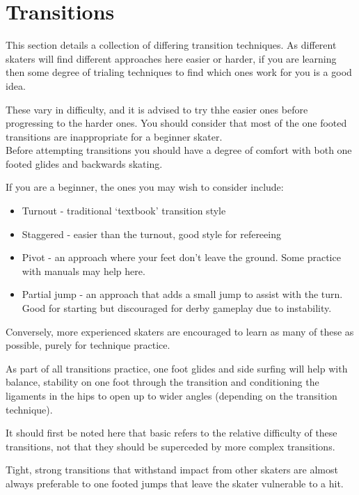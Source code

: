 \chapter{Transitions}

This section details a collection of differing transition techniques.
As different skaters will find different approaches here easier or harder, if you are learning then some degree of trialing techniques to find which ones work for you is a good idea. 

These vary in difficulty, and it is advised to try thhe easier ones before progressing to the harder ones.
You should consider that most of the one footed transitions are inappropriate for a beginner skater.\\


Before attempting transitions you should have a degree of comfort with both one footed glides and backwards skating.  

If you are a beginner, the ones you may wish to consider include:
\begin{itemize}
\item Turnout - traditional `textbook' transition style
\item Staggered - easier than the turnout, good style for refereeing    
\item Pivot - an approach where your feet don't leave the ground. Some practice with manuals may help here.  
\item Partial jump - an approach that adds a small jump to assist with the turn. Good for starting but discouraged for derby gameplay due to instability.   
\end{itemize}

Conversely, more experienced skaters are encouraged to learn as many of these as possible, purely for technique practice.  

As part of all transitions practice, one foot glides and side surfing will help with balance, stability on one foot through the transition and conditioning the ligaments in the hips to open up to wider angles (depending on the transition technique).




It should first be noted here that basic refers to the relative difficulty of these transitions, not that they should be superceded by more complex transitions.

Tight, strong transitions that withstand impact from other skaters are almost always preferable to one footed jumps that leave the skater vulnerable to a hit.  


